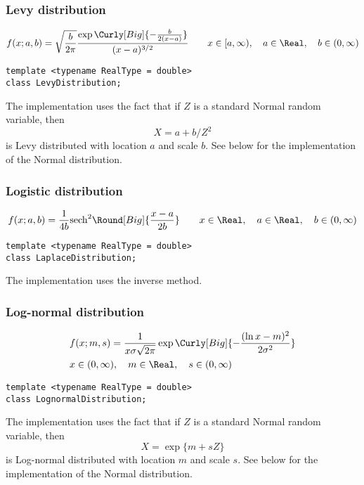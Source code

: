 \subsubsection{Levy distribution}

\begin{equation*}
  f(x;a,b) =
  \sqrt{\frac{b}{2\pi}}
  \frac{\exp\Curly[Big]{-\frac{b}{2(x - a)}}}{(x - a)^{3/2}} \qquad
  x \in [a, \infty),\quad a \in \Real,\quad b \in (0, \infty)
\end{equation*}
\begin{Verbatim}
template <typename RealType = double>
class LevyDistribution;
\end{Verbatim}
The implementation uses the fact that if $Z$ is a standard Normal random
variable, then
\begin{equation*}
  X = a + b / Z^2
\end{equation*}
is Levy distributed with location $a$ and scale $b$. See below for the
implementation of the Normal distribution.

\subsubsection{Logistic distribution}

\begin{equation*}
  f(x;a,b) = \frac{1}{4b}\mathrm{sech}^2\Round[Big]{\frac{x - a}{2b}} \qquad
  x \in \Real,\quad a \in \Real,\quad b \in (0, \infty)
\end{equation*}
\begin{Verbatim}
template <typename RealType = double>
class LaplaceDistribution;
\end{Verbatim}
The implementation uses the inverse method.

\subsubsection{Log-normal distribution}

\begin{align*}
  & f(x;m,s) =
  \frac{1}{x\sigma\sqrt{2\pi}}
  \exp\Curly[Big]{-\frac{(\ln x - m)^2}{2\sigma^2}} \\
  & x \in (0, \infty),\quad m \in \Real,\quad s \in (0, \infty)
\end{align*}
\begin{Verbatim}
template <typename RealType = double>
class LognormalDistribution;
\end{Verbatim}
The implementation uses the fact that if $Z$ is a standard Normal random
variable, then
\begin{equation*}
  X = \exp\{m + sZ\}
\end{equation*}
is Log-normal distributed with location $m$
and scale $s$. See below for the implementation of the Normal distribution.

